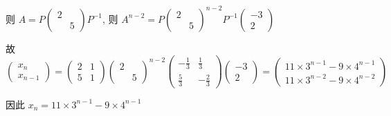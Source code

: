         则 \( A = P\begin{pmatrix}
             2 &   \\
               & 5
         \end{pmatrix}P^{-1} \), 则 \( A^{n-2} = P
         \begin{pmatrix}
             2 &   \\
               & 5
         \end{pmatrix} ^{n-2}P^{-1}
         \begin{pmatrix}
             -3 \\
             2
         \end{pmatrix}  \)

         故 \( \begin{pmatrix}
             x_{n} \\
             x_{n-1}
         \end{pmatrix} = \begin{pmatrix}
             2 & 1 \\
             5 & 1
         \end{pmatrix}\begin{pmatrix}
             2 &   \\
               & 5
         \end{pmatrix}^{n-2}\begin{pmatrix}
             -\frac{1}{3} & \frac{1}{3}  \\
             \frac{5}{3}  & -\frac{2}{3}
         \end{pmatrix}\begin{pmatrix}
             -3 \\
             2
         \end{pmatrix} = \begin{pmatrix}
             11\times3^{n-1}-9\times4^{n-1} \\
             11\times3^{n-2}-9\times4^{n-2}
         \end{pmatrix} \)

         因此 \( x_{n} = 11\times3^{n-1}-9\times4^{n-1} \)


